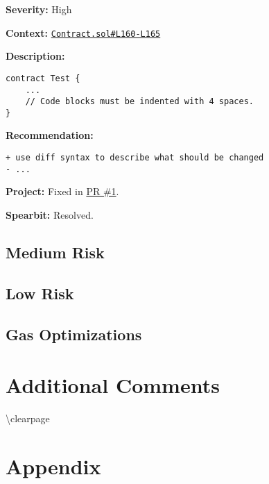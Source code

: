 \textbf{Severity:} High

\textbf{Context:}
\href{https://github.com/actuallink}{\texttt{Contract.sol\#L160-L165}}

\textbf{Description:}

\begin{verbatim}
contract Test {
    ...
    // Code blocks must be indented with 4 spaces.
}
\end{verbatim}

\textbf{Recommendation:}

\begin{verbatim}
+ use diff syntax to describe what should be changed
- ...
\end{verbatim}

\textbf{Project:} Fixed in \href{Https://github.com/actuallink}{PR \#1}.

\textbf{Spearbit:} Resolved.

\subsection{Medium Risk}\label{medium-risk}

\subsection{Low Risk}\label{low-risk}

\subsection{Gas Optimizations}\label{gas-optimizations}

\section{Additional Comments}\label{additional-comments}

\textbackslash clearpage

\section{Appendix}\label{appendix}
